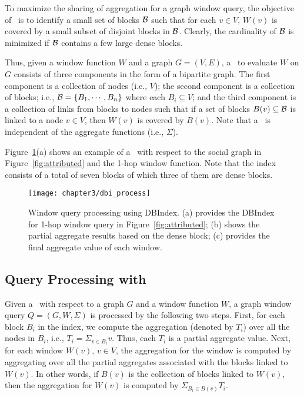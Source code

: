 To maximize the sharing of aggregation for a graph window query, 
the objective of \DBIndex\ is to identify a small set of blocks ${\cal B}$ such that
for each $v \in V$, $W(v)$ is covered by a small subset of disjoint blocks in ${\cal B}$.
Clearly, the cardinality of ${\cal B}$ is minimized if ${\cal B}$ contains a few large dense blocks.

Thus, given a window function $W$ and a graph $G=(V,E)$,
a \DBIndex\ to evaluate $W$ on $G$ consists of three components in the form of a bipartite graph.
The first component is a collection of nodes (i.e., $V$);
the second component is a collection of blocks; i.e., ${\cal B} = \{B_1,\cdots,B_n\}$ where each $B_i \subseteq V$;
and the third component is a collection of links from blocks to nodes
such that if a set of blocks $B(v) \subseteq {\cal B}$ is linked to a node $v \in V$,
then $W(v)$ is covered by $B(v)$.
Note that a \DBIndex\ is independent of the aggregate functions (i.e., $\Sigma$).

Figure~\ref{fig:dbi_agg}(a) shows an example of a \DBIndex\ with respect to the social graph in Figure~\ref{fig:attributed} and the 1-hop window function.
Note that the index consists of a total of seven blocks of which three of them are dense blocks.

\begin{figure}[t]
\centerline{
	\texttt{[image: chapter3/dbi\_process]} 
	}
	\caption{Window query processing using DBIndex. (a) provides the DBIndex for 1-hop window query in Figure~\ref{fig:attributed}; (b) shows the partial aggregate results based on the dense block; (c) provides the final aggregate value of each window.}
	\label{fig:dbi_agg}
\end{figure}

\subsection{Query Processing with \DBIndex}
Given a \DBIndex\ with respect to a graph $G$ and a window function $W$, a graph window query $Q = (G, W, \Sigma)$ is processed by the following two steps.
First, for each block $B_i$ in the index, we compute the aggregation (denoted by $T_i$) over all the nodes in $B_i$,
i.e., $T_i = \Sigma_{v \in B_i} v$. 
Thus, each $T_i$ is a partial aggregate value.
Next, for each window $W(v)$, $v \in V$, the aggregation for the window is computed by aggregating over all the partial aggregates associated with the blocks linked to $W(v)$.
In other words, if $B(v)$ is the collection of blocks linked to $W(v)$, 
then the aggregation for $W(v)$ is computed by $\Sigma_{B_i \in B(v)} T_i$. 

